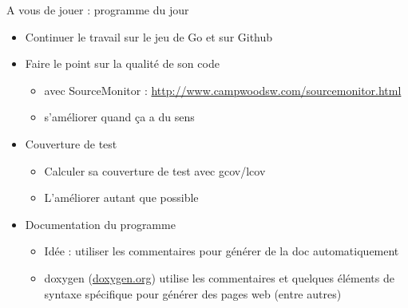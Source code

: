 \begin{frame}{A vous de jouer : programme du jour}
\begin{itemize}
\item Continuer le travail sur le jeu de Go et sur Github
\item Faire le point sur la qualité de son code
\begin{itemize}
\item avec SourceMonitor : \url{http://www.campwoodsw.com/sourcemonitor.html}
\item s'améliorer quand ça a du sens
\end{itemize}
\item Couverture de test
\begin{itemize}
\item Calculer sa couverture de test avec gcov/lcov
\item L'améliorer autant que possible
\end{itemize}
\item Documentation du programme
\begin{itemize}
\item Idée : utiliser les commentaires pour générer de la doc automatiquement
\item doxygen (\url{doxygen.org}) utilise les commentaires et quelques éléments de syntaxe spécifique pour générer des pages web (entre autres)
\end{itemize}
\end{itemize}
\end{frame}